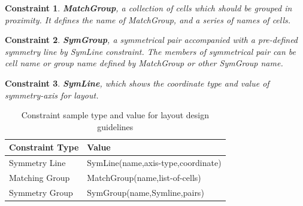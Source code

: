     \newtheorem{Cons}{Constraint}
    \begin{Cons}
      {\bf MatchGroup}, a collection of cells which should be grouped in proximity. It defines the name of MatchGroup, and a series of names of cells.
    \end{Cons}
    \begin{Cons}
      {\bf SymGroup}, a symmetrical pair accompanied with a pre-defined symmetry line by SymLine constraint. The members of symmetrical pair can be cell name or group name defined by MatchGroup or other SymGroup name.
    \end{Cons}
    \begin{Cons}
      {\bf SymLine}, which shows the coordinate type and value of symmetry-axis for layout.
    \end{Cons}
  
  
    \begin{table}[ht]
      \centering
      \caption{Constraint sample type and value for layout design guidelines}\label{tableConType}
      \begin{scriptsize}
        \begin{tabular}[t]{|l|l|}
          \hline
          Constraint Type & Value \\
          \hline
          Symmetry Line & SymLine(name,axis-type,coordinate)  \\
          \hline
          Matching Group  & MatchGroup(name,list-of-cells)  \\
          \hline
          Symmetry Group  & SymGroup(name,Symline,pairs)  \\
          \hline
        \end{tabular}
      \end{scriptsize}
    \end{table}


